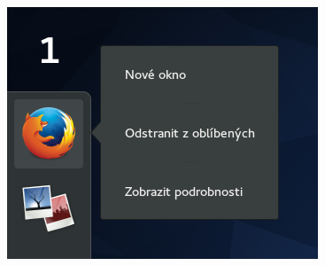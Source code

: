 \begin{figure}[t]
\begin{center}
\includegraphics[width=\textwidth]{img/dash-b}
 \label{fig:dash-b}
\end{center}
\end{figure}


